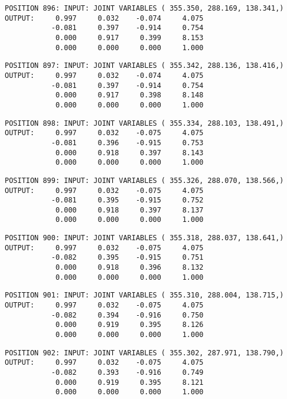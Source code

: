 \begin{verbatim}
POSITION 896: INPUT: JOINT VARIABLES ( 355.350, 288.169, 138.341,)
OUTPUT:     0.997     0.032    -0.074     4.075
           -0.081     0.397    -0.914     0.754
            0.000     0.917     0.399     8.153
            0.000     0.000     0.000     1.000
\end{verbatim} \pagebreak[1]\begin{verbatim}
POSITION 897: INPUT: JOINT VARIABLES ( 355.342, 288.136, 138.416,)
OUTPUT:     0.997     0.032    -0.074     4.075
           -0.081     0.397    -0.914     0.754
            0.000     0.917     0.398     8.148
            0.000     0.000     0.000     1.000
\end{verbatim} \pagebreak[1]\begin{verbatim}
POSITION 898: INPUT: JOINT VARIABLES ( 355.334, 288.103, 138.491,)
OUTPUT:     0.997     0.032    -0.075     4.075
           -0.081     0.396    -0.915     0.753
            0.000     0.918     0.397     8.143
            0.000     0.000     0.000     1.000
\end{verbatim} \pagebreak[1]\begin{verbatim}
POSITION 899: INPUT: JOINT VARIABLES ( 355.326, 288.070, 138.566,)
OUTPUT:     0.997     0.032    -0.075     4.075
           -0.081     0.395    -0.915     0.752
            0.000     0.918     0.397     8.137
            0.000     0.000     0.000     1.000
\end{verbatim} \pagebreak[1]\begin{verbatim}
POSITION 900: INPUT: JOINT VARIABLES ( 355.318, 288.037, 138.641,)
OUTPUT:     0.997     0.032    -0.075     4.075
           -0.082     0.395    -0.915     0.751
            0.000     0.918     0.396     8.132
            0.000     0.000     0.000     1.000
\end{verbatim} \pagebreak[1]\begin{verbatim}
POSITION 901: INPUT: JOINT VARIABLES ( 355.310, 288.004, 138.715,)
OUTPUT:     0.997     0.032    -0.075     4.075
           -0.082     0.394    -0.916     0.750
            0.000     0.919     0.395     8.126
            0.000     0.000     0.000     1.000
\end{verbatim} \pagebreak[1]\begin{verbatim}
POSITION 902: INPUT: JOINT VARIABLES ( 355.302, 287.971, 138.790,)
OUTPUT:     0.997     0.032    -0.075     4.075
           -0.082     0.393    -0.916     0.749
            0.000     0.919     0.395     8.121
            0.000     0.000     0.000     1.000
\end{verbatim} \pagebreak[1]\begin{verbatim}

\end{verbatim}
